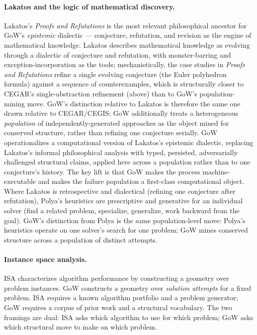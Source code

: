 \documentclass[11pt]{article}
\theoremstyle{gowthm}
\theoremstyle{gowplain}
\begin{document}
\paragraph{Lakatos and the logic of mathematical discovery.}
Lakatos's \emph{Proofs and Refutations} \citep{lakatos1976proofs} is the
most relevant philosophical ancestor for GoW's \emph{epistemic} dialectic ---
conjecture, refutation, and revision as the engine of mathematical knowledge.
Lakatos describes mathematical
knowledge as evolving through a dialectic of conjecture and refutation, with
monster-barring and exception-incorporation as the tools; mechanistically,
the case studies in \emph{Proofs and Refutations} refine a single evolving
conjecture (the Euler polyhedron formula) against a sequence of
counterexamples, which is structurally closer to CEGAR's single-abstraction
refinement (above) than to GoW's population-mining move. GoW's
distinction relative to Lakatos is therefore the same one drawn relative to
CEGAR/CEGIS: GoW additionally treats a heterogeneous \emph{population} of
independently-generated approaches as the object mined for conserved
structure, rather than refining one conjecture serially. GoW operationalizes
a computational version of Lakatos's epistemic dialectic, replacing Lakatos's informal
philosophical analysis with typed, persisted, adversarially challenged structural
claims, applied here across a population rather than to one conjecture's
history. The key lift is that GoW makes the process machine-executable and
makes the failure population a first-class computational object.
Where Lakatos is retrospective and dialectical (refining one conjecture after
refutation), Polya's heuristics \citep{polya1945solve} are prescriptive and
generative for an individual solver (find a related problem, specialize,
generalize, work backward from the goal). GoW's distinction from Polya is the
same population-level move: Polya's heuristics operate on one solver's search
for one problem; GoW mines conserved structure across a population of
distinct attempts.

\paragraph{Instance space analysis.}
ISA \citep{smith2014instancespace} characterizes algorithm performance by
constructing a geometry over problem instances. GoW constructs a geometry over
\emph{solution attempts} for a fixed problem. ISA requires a known algorithm
portfolio and a problem generator; GoW requires a corpus of prior work and a
structural vocabulary. The two framings are dual: ISA asks which algorithm to
use for which problem; GoW asks which structural move to make on which problem.
\end{document}
